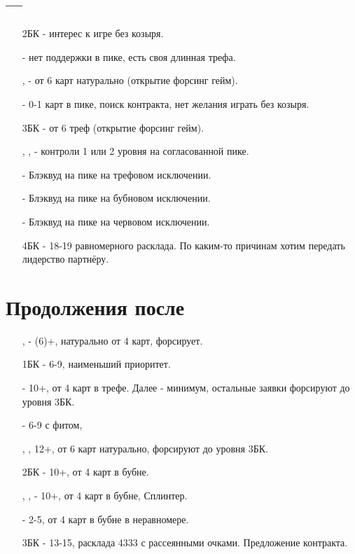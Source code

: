 \documentclass{article}
\begin{document}
\subsection{ --- }
\begin{enumerate}
    \item[2БК] - интерес к игре без козыря.
    \item[\cl{3}] - нет поддержки в пике, есть своя длинная трефа.
    \item[\di{3}, \he{3}] - от 6 карт натурально (открытие форсинг гейм).
    \item[\sp{3}] - 0-1 карт в пике, поиск контракта, нет желания играть без козыря.
    \item[3БК] - от 6 треф (открытие форсинг гейм).
    \item[\cl{4}, \di{4}, \he{4}] - контроли 1 или 2 уровня на согласованной пике.
    \item[\sp{4}] - Блэквуд на пике на трефовом исключении.
    \item[\cl{5}] - Блэквуд на пике на бубновом исключении.
    \item[\di{5}] - Блэквуд на пике на червовом исключении.
    \item[4БК] - 18-19 равномерного расклада. По каким-то причинам хотим передать лидерство партнёру.
\end{enumerate}
\section{Продолжения после }
\begin{enumerate}
    \item[\he{1}, \sp{1}] - (6)+, натурально от 4 карт, форсирует.
    \item[1БК] - 6-9, наименьший приоритет.
    \item[\cl{2}] - 10+, от 4 карт в трефе. Далее  - минимум, остальные заявки форсируют до уровня 3БК.
    \item[\di{2}] - 6-9 с фитом,
    \item[\he{2}, \sp{2}], 12+, от 6 карт натурально, форсируют до уровня 3БК.
    \item[2БК] - 10+, от 4 карт в бубне.
    \item[\cl{3}, \he{3}, \sp{3}] - 10+, от 4 карт в бубне, Сплинтер.
    \item[\di{3}] - 2-5, от 4 карт в бубне в неравномере.
    \item[3БК] - 13-15, расклада 4333 с рассеянными очками. Предложение контракта.
\end{enumerate}
\end{document}
